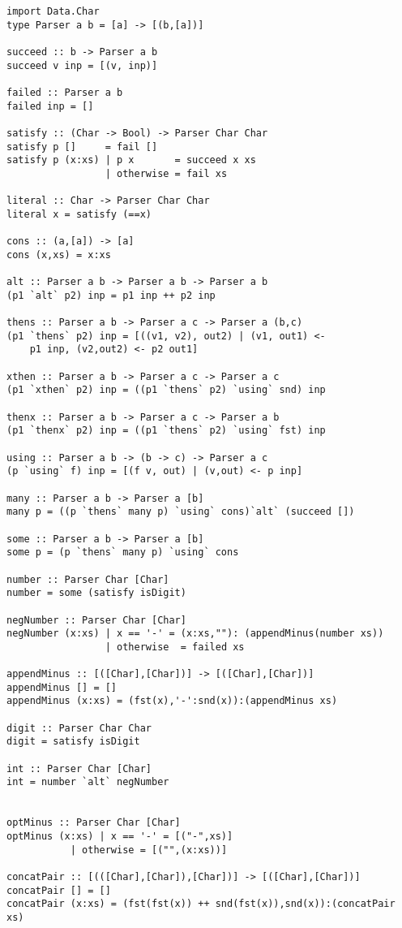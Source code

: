 \documentclass[11pt]{article}
\begin{document}
\begin{verbatim}
import Data.Char
type Parser a b = [a] -> [(b,[a])]

succeed :: b -> Parser a b
succeed v inp = [(v, inp)]

failed :: Parser a b
failed inp = []

satisfy :: (Char -> Bool) -> Parser Char Char
satisfy p []     = fail []
satisfy p (x:xs) | p x       = succeed x xs
                 | otherwise = fail xs

literal :: Char -> Parser Char Char
literal x = satisfy (==x)

cons :: (a,[a]) -> [a]
cons (x,xs) = x:xs

alt :: Parser a b -> Parser a b -> Parser a b
(p1 `alt` p2) inp = p1 inp ++ p2 inp

thens :: Parser a b -> Parser a c -> Parser a (b,c)
(p1 `thens` p2) inp = [((v1, v2), out2) | (v1, out1) <- 
    p1 inp, (v2,out2) <- p2 out1]  

xthen :: Parser a b -> Parser a c -> Parser a c
(p1 `xthen` p2) inp = ((p1 `thens` p2) `using` snd) inp

thenx :: Parser a b -> Parser a c -> Parser a b
(p1 `thenx` p2) inp = ((p1 `thens` p2) `using` fst) inp

using :: Parser a b -> (b -> c) -> Parser a c
(p `using` f) inp = [(f v, out) | (v,out) <- p inp]

many :: Parser a b -> Parser a [b]
many p = ((p `thens` many p) `using` cons)`alt` (succeed [])

some :: Parser a b -> Parser a [b]
some p = (p `thens` many p) `using` cons

number :: Parser Char [Char]
number = some (satisfy isDigit)

negNumber :: Parser Char [Char]
negNumber (x:xs) | x == '-' = (x:xs,""): (appendMinus(number xs))
                 | otherwise  = failed xs

appendMinus :: [([Char],[Char])] -> [([Char],[Char])]
appendMinus [] = []
appendMinus (x:xs) = (fst(x),'-':snd(x)):(appendMinus xs)

digit :: Parser Char Char
digit = satisfy isDigit

int :: Parser Char [Char]
int = number `alt` negNumber


optMinus :: Parser Char [Char]
optMinus (x:xs) | x == '-' = [("-",xs)]
           | otherwise = [("",(x:xs))]

concatPair :: [(([Char],[Char]),[Char])] -> [([Char],[Char])]
concatPair [] = []
concatPair (x:xs) = (fst(fst(x)) ++ snd(fst(x)),snd(x)):(concatPair xs)


\end{verbatim}
\end{document}
